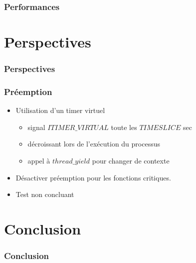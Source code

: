 \documentclass{beamer}
\begin{document}
\begin{frame}
  \frametitle{Performances}
\end{frame}

\section{Perspectives}

\begin{frame}
  \frametitle{Perspectives}
\end{frame}

\begin{frame}
  \frametitle{Préemption}
  \begin{itemize}
    \item Utilisation d'un timer virtuel
      \begin{itemize}
      \item signal $ITIMER\_VIRTUAL$ toute les $TIMESLICE$ sec
      \item décroissant lors de l'exécution du processus
      \item appel à $thread\_yield$ pour changer de contexte
      \end{itemize}
    \item Désactiver préemption pour les fonctions critiques.
    \item Test non concluant
  \end{itemize}
\end{frame}

\section{Conclusion}

\begin{frame}
  \frametitle{Conclusion}
\end{frame}


 
\end{document}
